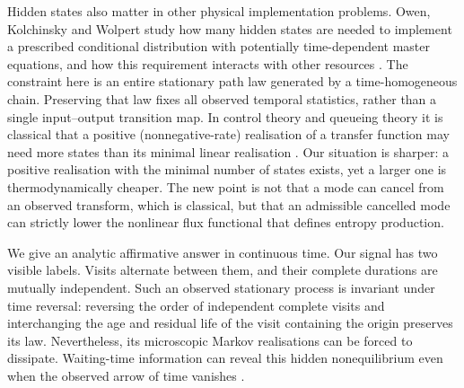 \documentclass[11pt,a4paper]{article}
\theoremstyle{remark}\newtheorem{remark}[theorem]{Remark}
\begin{document}
Hidden states also matter in other physical implementation problems. Owen,
Kolchinsky and Wolpert study how many hidden states are needed to implement a
prescribed conditional distribution with potentially time-dependent master
equations, and how this requirement interacts with other resources
\cite{owen}. The constraint here is an entire stationary path law
generated by a time-homogeneous chain. Preserving that law fixes all observed
temporal statistics, rather than a single input--output transition map.
In control theory and queueing theory it is classical that a positive
(nonnegative-rate) realisation of a transfer function may need more states
than its minimal linear realisation \cite{benvenuti,ocinneide}. Our situation
is sharper: a positive realisation with the minimal number of states exists,
yet a larger one is thermodynamically cheaper. The new point is not that a
mode can cancel from an observed transform, which is classical, but that an
admissible cancelled mode can strictly lower the nonlinear flux functional
that defines entropy production.

We give an analytic affirmative answer in continuous time. Our signal has two
visible labels. Visits alternate between them, and their complete durations
are mutually independent. Such an observed stationary process is invariant
under time reversal: reversing the order of independent complete visits and
interchanging the age and residual life of the visit containing the origin
preserves its law. Nevertheless, its microscopic Markov realisations can be
forced to dissipate. Waiting-time information can reveal this hidden
nonequilibrium even when the observed arrow of time vanishes
\cite{skinner_wait,skinner_improved}.
\end{document}
